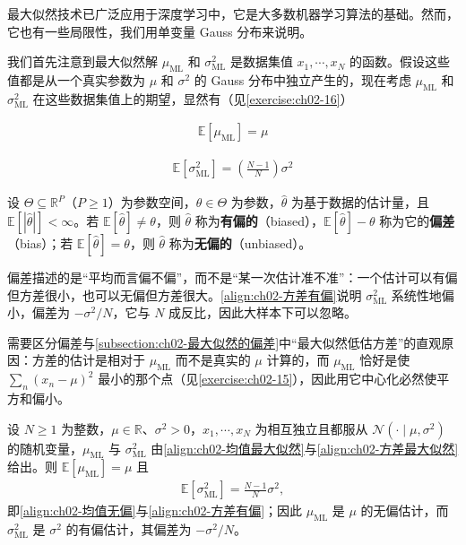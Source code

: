 \documentclass[../../main.tex]{subfiles}
\begin{document}
最大似然技术已广泛应用于深度学习中，它是大多数机器学习算法的基础。然而，它也有一些局限性，我们用单变量 Gauss 分布来说明。

我们首先注意到最大似然解 $\mu_{\mathrm{ML}}$ 和 $\sigma_{\mathrm{ML}}^{2}$ 是数据集值 $x_1,\cdots,x_N$ 的函数。假设这些值都是从一个真实参数为 $\mu$ 和 $\sigma^{2}$ 的 Gauss 分布中独立产生的，现在考虑 $\mu_{\mathrm{ML}}$ 和 $\sigma_{\mathrm{ML}}^{2}$ 在这些数据集值上的期望，显然有（见\cref{exercise:ch02-16}）

\begin{align}
  \mathbb{E}\left[\mu_{\mathrm{ML}}\right] = \mu
  \label{align:ch02-均值无偏}
\end{align}

\begin{align}
  \mathbb{E}\left[\sigma_{\mathrm{ML}}^{2}\right] = \left(\frac{N-1}{N}\right)\sigma^{2}
  \label{align:ch02-方差有偏}
\end{align}

\begin{definition}[偏差]\label{definition:ch02-偏差}
设 $\Theta\subseteq\mathbb{R}^{P}$（$P\geqslant1$）为参数空间，$\theta\in\Theta$ 为参数，$\hat{\theta}$ 为基于数据的估计量，且 $\mathbb{E}[|\hat{\theta}|]<\infty$。若 $\mathbb{E}[\hat{\theta}]\neq\theta$，则 $\hat{\theta}$ 称为\textbf{有偏的}（biased），$\mathbb{E}[\hat{\theta}]-\theta$ 称为它的\textbf{偏差}（bias）；若 $\mathbb{E}[\hat{\theta}]=\theta$，则 $\hat{\theta}$ 称为\textbf{无偏的}（unbiased）。
\end{definition}

\begin{remark}
偏差描述的是“平均而言偏不偏”，而不是“某一次估计准不准”：一个估计可以有偏但方差很小，也可以无偏但方差很大。\eqref{align:ch02-方差有偏}说明 $\sigma_{\mathrm{ML}}^{2}$ 系统性地偏小，偏差为 $-\sigma^{2}/N$，它与 $N$ 成反比，因此大样本下可以忽略。

需要区分偏差与\cref{subsection:ch02-最大似然的偏差}中“最大似然低估方差”的直观原因：方差的估计是相对于 $\mu_{\mathrm{ML}}$ 而不是真实的 $\mu$ 计算的，而 $\mu_{\mathrm{ML}}$ 恰好是使 $\sum_n(x_n-\mu)^{2}$ 最小的那个点（见\cref{exercise:ch02-15}），因此用它中心化必然使平方和偏小。
\end{remark}

\begin{proposition}[最大似然估计的期望]\label{proposition:ch02-最大似然期望}
设 $N\geqslant1$ 为整数，$\mu\in\mathbb{R}$、$\sigma^{2}>0$，$x_1,\cdots,x_N$ 为相互独立且都服从 $\mathcal{N}(\cdot\mid\mu,\sigma^{2})$ 的随机变量，$\mu_{\mathrm{ML}}$ 与 $\sigma_{\mathrm{ML}}^{2}$ 由\eqref{align:ch02-均值最大似然}与\eqref{align:ch02-方差最大似然}给出。则 $\mathbb{E}[\mu_{\mathrm{ML}}]=\mu$ 且
\begin{align*}
  \mathbb{E}\left[\sigma_{\mathrm{ML}}^{2}\right]=\frac{N-1}{N}\sigma^{2},
\end{align*}
即\eqref{align:ch02-均值无偏}与\eqref{align:ch02-方差有偏}；因此 $\mu_{\mathrm{ML}}$ 是 $\mu$ 的无偏估计，而 $\sigma_{\mathrm{ML}}^{2}$ 是 $\sigma^{2}$ 的有偏估计，其偏差为 $-\sigma^{2}/N$。
\end{proposition}
\end{document}
